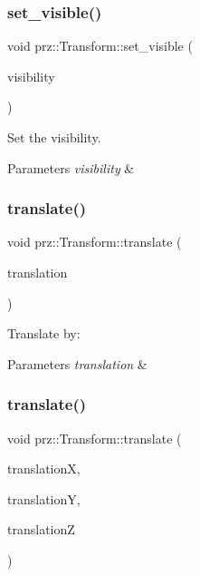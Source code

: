 \subsubsection{\texorpdfstring{set\_visible()}{set\_visible()}}
{\footnotesize\ttfamily void prz\+::\+Transform\+::set\+\_\+visible (\begin{DoxyParamCaption}\item[{bool}]{visibility }\end{DoxyParamCaption})}



Set the visibility. 


\begin{DoxyParams}{Parameters}
{\em visibility} & \\
\hline
\end{DoxyParams}
\mbox{\label{classprz_1_1_transform_afb3676728f23569e5589adadcb4ae3d3}} 
\subsubsection{\texorpdfstring{translate()}{translate()}\hspace{0.1cm}{\footnotesize\ttfamily [1/2]}}
{\footnotesize\ttfamily void prz\+::\+Transform\+::translate (\begin{DoxyParamCaption}\item[{const P\+Vec3 \&}]{translation }\end{DoxyParamCaption})}



Translate by\+: 


\begin{DoxyParams}{Parameters}
{\em translation} & \\
\hline
\end{DoxyParams}
\mbox{\label{classprz_1_1_transform_ad90f3df96f31284ebec55fcbbb61e8be}} 
\subsubsection{\texorpdfstring{translate()}{translate()}\hspace{0.1cm}{\footnotesize\ttfamily [2/2]}}
{\footnotesize\ttfamily void prz\+::\+Transform\+::translate (\begin{DoxyParamCaption}\item[{float}]{translationX,  }\item[{float}]{translationY,  }\item[{float}]{translationZ }\end{DoxyParamCaption})}



